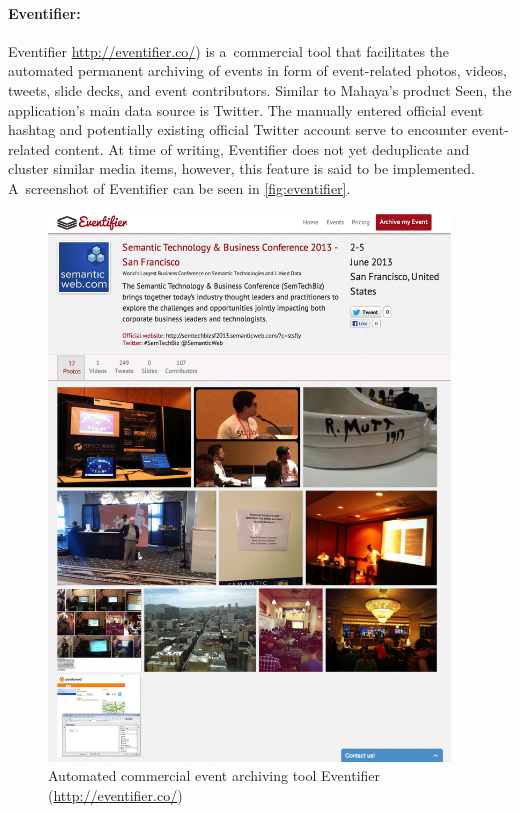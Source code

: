 \paragraph{Eventifier:}

Eventifier \url{http://eventifier.co/}) is a~commercial tool
that facilitates the automated permanent archiving of events
in form of event-related photos, videos, tweets, slide decks,
and event contributors.
Similar to Mahaya's product Seen,
the application's main data source is Twitter.
The manually entered official event hashtag and potentially existing
official Twitter account serve to encounter event-related content.
At time of writing, Eventifier does not yet
deduplicate and cluster similar media items,
however, this feature is said to be implemented.
A~screenshot of Eventifier can be seen in \autoref{fig:eventifier}.

\begin{figure}
  \centering
  \includegraphics[width=0.95\textwidth,height=0.9\textheight,keepaspectratio]{eventifier.png}
  \caption[Automated commercial event archiving tool Eventifier]{Automated commercial event archiving tool Eventifier
    (\url{http://eventifier.co/})}
  \label{fig:eventifier}
\end{figure}

